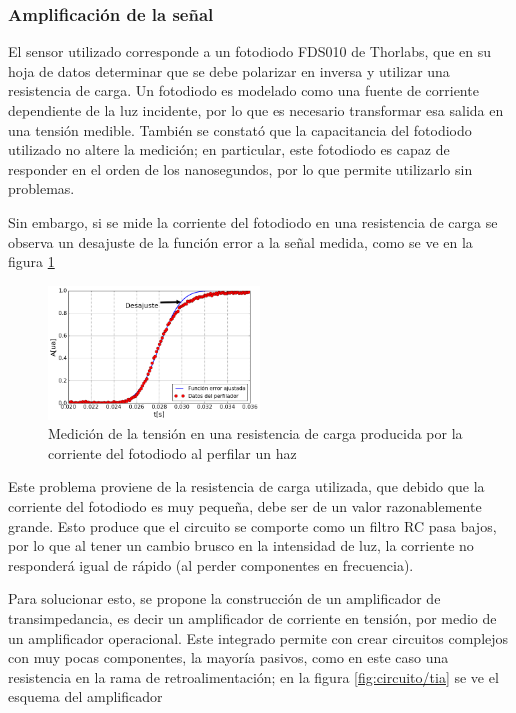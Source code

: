 \subsubsection{Amplificación de la señal}

El sensor utilizado corresponde a un fotodiodo  FDS010\cite{fds010} de Thorlabs, que en su hoja de datos determinar que se debe polarizar en inversa y utilizar una resistencia de carga. Un fotodiodo es modelado como una fuente de corriente dependiente de la luz incidente, por lo que es necesario transformar esa salida en una tensión medible. También se constató que la capacitancia del fotodiodo utilizado no altere la medición; en particular, este fotodiodo es capaz de responder en el orden de los nanosegundos, por lo que permite utilizarlo sin problemas.

Sin embargo, si se mide la corriente del fotodiodo en una resistencia de carga se observa un desajuste de la función error a la señal medida, como se ve en la figura \ref{fig:circuito/desajuste}

\begin{figure}[H]
    \centering
    \includegraphics[width=0.5\textwidth]{fig/perfilador/labo6/fit_data_labo6_anotado}
    \caption{Medición de la tensión en una resistencia de carga producida por la corriente del fotodiodo al perfilar un haz}
    \label{fig:circuito/desajuste}
\end{figure}

Este problema proviene de la resistencia de carga utilizada, que debido que la corriente del fotodiodo es muy pequeña, debe ser de un valor razonablemente grande. Esto produce que el circuito se comporte como un filtro RC pasa bajos, por lo que al tener un cambio brusco en la intensidad de luz, la corriente no responderá igual de rápido (al perder componentes en frecuencia). 

Para solucionar esto, se propone la construcción de un amplificador de transimpedancia, es decir un amplificador de corriente en tensión, por medio de un amplificador operacional. Este integrado permite con crear circuitos complejos con muy pocas componentes, la mayoría pasivos, como en este caso una resistencia en la rama de retroalimentación; en la figura \ref{fig:circuito/tia} se ve el esquema del amplificador

